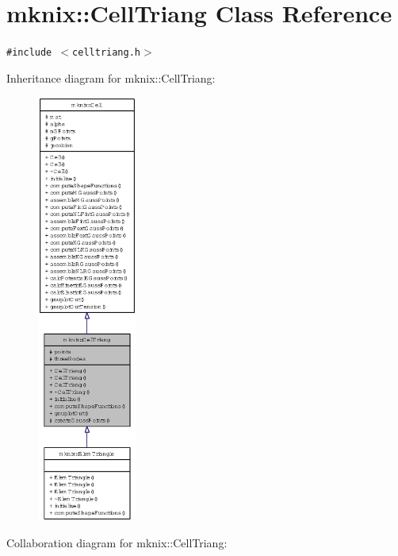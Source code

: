 \hypertarget{classmknix_1_1CellTriang}{
\section{mknix::CellTriang Class Reference}
\label{classmknix_1_1CellTriang}
}
{\tt \#include $<$celltriang.h$>$}

Inheritance diagram for mknix::CellTriang:\nopagebreak
\begin{figure}[H]
\begin{center}
\leavevmode
\includegraphics[height=400pt]{classmknix_1_1CellTriang__inherit__graph}
\end{center}
\end{figure}
Collaboration diagram for mknix::CellTriang:\nopagebreak
